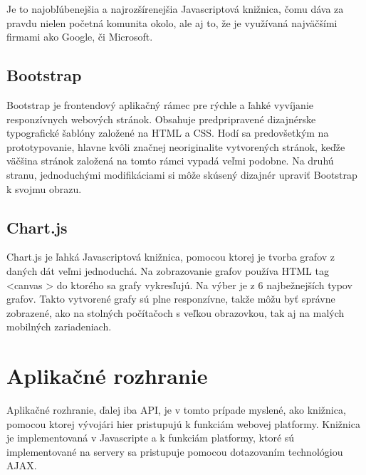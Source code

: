 Je to najobľúbenejšia a najrozšírenejšia Javascriptová knižnica, čomu dáva za pravdu nielen početná komunita okolo, ale aj to, že je využívaná najväčšími firmami ako Google, či Microsoft. \cite{w3-jquery}

\subsection{Bootstrap}
\label{sec:bootstrap}
Bootstrap je frontendový aplikačný rámec pre rýchle a ľahké vyvíjanie responzívnych webových stránok. Obsahuje predpripravené dizajnérske typografické šablóny založené na HTML a CSS. Hodí sa predovšetkým na prototypovanie, hlavne kvôli značnej neoriginalite vytvorených stránok, keďže väčšina stránok založená na tomto rámci vypadá veľmi podobne. Na druhú stranu, jednoduchými modifikáciami si môže skúsený dizajnér upraviť Bootstrap k svojmu obrazu. \cite{w3-bootstrap}

\subsection{Chart.js}
\label{sec:chartjs}
Chart.js je ľahká Javascriptová knižnica, pomocou ktorej je tvorba grafov z daných dát veľmi jednoduchá. Na zobrazovanie grafov používa HTML tag <canvas > do ktorého sa grafy vykresľujú. Na výber je z 6 najbežnejších typov grafov. Takto vytvorené grafy sú plne responzívne, takže môžu byť správne zobrazené, ako na stolných počítačoch s veľkou obrazovkou, tak aj na malých mobilných zariadeniach.

\section{Aplikačné rozhranie}
\label{sec:api}
Aplikačné rozhranie, ďalej iba API, je v tomto prípade myslené, ako knižnica, pomocou ktorej vývojári hier pristupujú k funkciám webovej platformy. Knižnica je implementovaná v Javascripte a k funkciám platformy, ktoré sú implementované na servery sa pristupuje pomocou dotazovaním technológiou AJAX.

